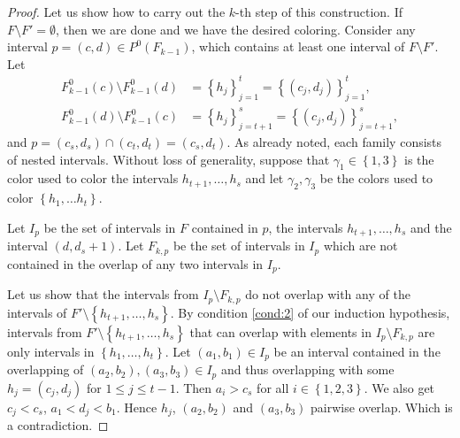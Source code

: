 \documentclass[12pt]{article}
\theoremstyle{definition}
\begin{document}
\begin{proof}
        Let us show how to carry out the 
        $k$-th step of this construction.
        If $F \setminus F' = \emptyset$,
        then we are done and we have 
        the desired coloring.
        Consider any interval
        $p = \left(c, d\right)
        \in P^{0}\left(F_{k-1}\right)$,
        which contains at least one interval
        of $F \setminus F'$. 
        Let
        \begin{align*}
            F^{0}_{k-1}\left(c\right) \setminus 
            F^{0}_{k-1}\left(d\right)
            &= \left\{h_{j}\right\}_{j=1}^{t}
            = \left\{\left(c_{j},
            d_{j}\right)\right\}_{j=1}^{t}, \\
            F^{0}_{k-1}\left(d\right) \setminus 
            F^{0}_{k-1} \left(c\right)
            &= \left\{h_{j}\right\}_{j=t+1}^{s}
            = \left\{\left(c_{j},
            d_{j}\right)\right\}_{j=t+1}^{s},
        \end{align*}
        and $p = \left(c_{s}, d_{s}\right)
        \cap \left(c_{t}, d_{t}\right) = 
        \left(c_{s}, d_{t}\right)$.
        As already noted, 
        each
        family consists of
        nested intervals.
        Without loss of generality,
        suppose that
        $\gamma_1 \in \left\{1, 3\right\}$
        is the color used to
        color the intervals
        $h_{t+1}, \ldots, h_{s}$
        and 
        let $\gamma_{2}, \gamma_{3}$
        be the colors used to 
        color
        $\left\{h_1, \ldots h_t\right\}$.
        
        Let $I_{p}$ be the
        set of intervals in $F$ 
        contained in $p$,
        the intervals $h_{t+1},
        \ldots, h_{s}$ and the 
        interval 
        $\left(d, d_{s} + 1\right)$.
        Let $F_{k, p}$ be 
        the set of intervals in $I_{p}$ 
        which are not contained in
        the overlap of any two
        intervals in $I_{p}$. 

        Let us show that the 
        intervals from $I_{p}
        \setminus F_{k, p}$ 
        do 
        not overlap with 
        any of the intervals of
        $F' \setminus \left\{
        h_{t+1},\ldots,h_{s}\right\}$.
        By condition \ref{cond:2}
        of our induction hypothesis, 
        intervals from
        $F' \setminus \left\{h_{t+1},
        \ldots, h_{s}\right\}$
        that can overlap with 
        elements in $I_{p} \setminus 
        F_{k,p}$ 
        are only intervals
        in $\left\{h_1, \ldots, h_{t}\right\}$.
        Let $\left(a_1, b_1\right) \in I_{p}$ 
        be an interval contained in the
        overlapping of
        $\left(a_2, b_2\right), 
        \left(a_3, b_3\right)
        \in I_{p}$ and thus
        overlapping with some
        $h_{j} =\left(c_{j}, d_{j}\right)$ 
        for $1 \leq j \leq t-1$.
        Then $a_{i} > c_{s}$ for
        all $i \in \left\{1, 2, 3\right\}$.
        We also get $c_{j} < c_{s}$,
        $a_1 < d_{j} < b_1$. Hence
        $h_{j}$, $\left(a_2, b_2\right)$ 
        and $\left(a_3, b_3\right)$ 
        pairwise overlap.
        Which is a contradiction.


\end{proof}
\end{document}
